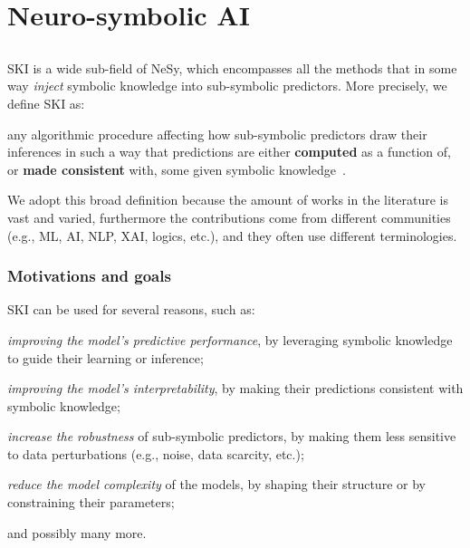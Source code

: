 
\chapter{Neuro-symbolic AI}
\label{ch:nesy-ai}
\minitoc

\section[Symbolic knowledge injection]{}\label{sec:ski}
%
\Gls{SKI} is a wide sub-field of \gls{NeSy}, which encompasses all the methods that in some way \emph{inject} symbolic knowledge into sub-symbolic predictors.
%
More precisely, we define \gls{SKI} as:
%
\begin{definition}
    \label{def:ski}
    any algorithmic procedure affecting how sub-symbolic predictors draw their inferences in such a way that predictions are either \textbf{computed} as a function of, or \textbf{made consistent} with, some given symbolic knowledge~\cite{DBLP:journals/csur/CiattoSAMO24}.
\end{definition}
%
We adopt this broad definition because the amount of works in the literature is vast and varied, furthermore the contributions come from different communities (e.g., \gls{ML}, \gls{AI}, \gls{NLP}, \gls{XAI}, logics, etc.), and they often use different terminologies.


\subsection{Motivations and goals}\label{subsec:ski-motivations-and-goals}
%
\Gls{SKI} can be used for several reasons, such as:
%
\begin{inlinelist}
    \item \label{itm:prediction}\emph{improving the model's predictive performance}, by leveraging symbolic knowledge to guide their learning or inference;
    \item \label{itm:interpretability}\emph{improving the model's interpretability}, by making their predictions consistent with symbolic knowledge;
    \item \label{itm:robustness}\emph{increase the robustness} of sub-symbolic predictors, by making them less sensitive to data perturbations (e.g., noise, data scarcity, etc.);
    \item \label{itm:complexity}\emph{reduce the model complexity} of the models, by shaping their structure or by constraining their parameters;
    \item and possibly many more.
\end{inlinelist}


